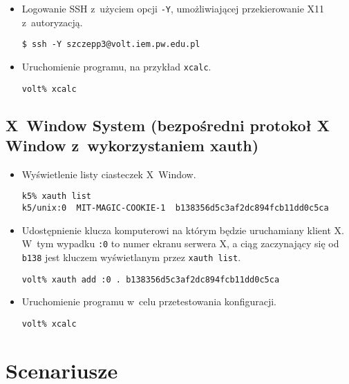 \documentclass[a4paper,11pt]{article}
\begin{document}
\begin{itemize}

\item Logowanie SSH z~użyciem opcji \verb|-Y|, umożliwiającej przekierowanie X11
    z~autoryzacją.

\begin{verbatim}
$ ssh -Y szczepp3@volt.iem.pw.edu.pl
\end{verbatim}

\item Uruchomienie programu, na przykład \verb|xcalc|.

\begin{verbatim}
volt% xcalc
\end{verbatim}

\end{itemize}

\subsection{X~Window System (bezpośredni protokoł X Window z~wykorzystaniem xauth)}

\begin{itemize}

\item Wyświetlenie listy ciasteczek X~Window.

\begin{verbatim}
k5% xauth list
k5/unix:0  MIT-MAGIC-COOKIE-1  b138356d5c3af2dc894fcb11dd0c5ca
\end{verbatim}

\item Udostępnienie klucza komputerowi na którym będzie uruchamiany klient X.
      W~tym wypadku \verb|:0| to numer ekranu serwera X, a ciąg zaczynający
      się od \verb|b138| jest kluczem wyświetlanym przez \verb|xauth list|.

\begin{verbatim}
volt% xauth add :0 . b138356d5c3af2dc894fcb11dd0c5ca
\end{verbatim}

\item Uruchomienie programu w~celu przetestowania konfiguracji.

\begin{verbatim}
volt% xcalc
\end{verbatim}


\end{itemize}

\section{Scenariusze}
\end{document}
